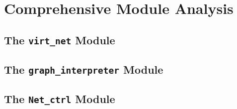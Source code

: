 \chapter{Comprehensive Module Analysis}
    \section{The \texttt{virt\_net} Module} \label{sec:virt-net-module}
        
        
        
        
        
        
        
        

    \section{The \texttt{graph\_interpreter} Module} \label{sec:graph-interpreter-module}
        

    \section{The \texttt{Net\_ctrl} Module} \label{sec:net-ctrl-module}
        
